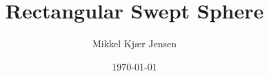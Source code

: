 \documentclass[11pt,oneside,a4paper]{article}
\title{Rectangular Swept Sphere}
\author{Mikkel Kjær Jensen}
\date{\today}
\begin{document}
\maketitle
\abstract{
}

\tableofcontents


%
%
%
%
%
%
%
%
\end{document}
